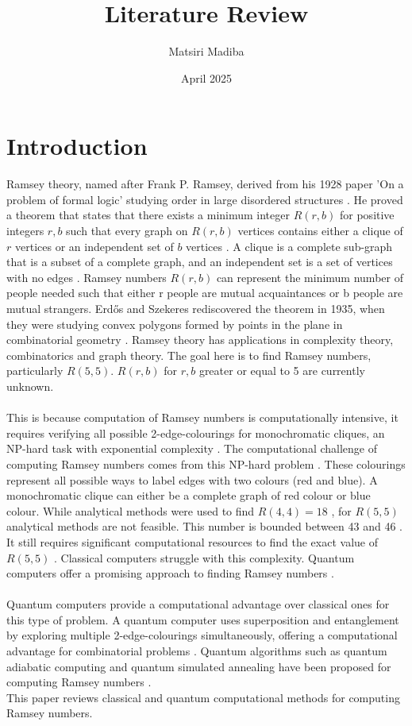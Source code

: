 \documentclass{Assignment}
\author{Matsiri Madiba}
\date{April 2025}
\title{Literature Review}
\begin{document}
\maketitle

\section{Introduction}
Ramsey theory, named after Frank P. Ramsey, derived from his 1928 paper 'On a problem of formal logic' studying order in large disordered structures \cite{graham1980ramsey}.
He proved a theorem that states that there exists a minimum integer $R(r,b)$ for positive integers $r, b$ such that every graph on $R(r,b)$ vertices contains either a clique of $r$ vertices or an independent set of $b$ vertices \cite{BondyMurty2008}.
A clique is a complete sub-graph that is a subset of a complete graph, and an independent set is a set of vertices with no edges \cite{BondyMurty2008}.	
Ramsey numbers $R(r,b)$ can represent the minimum number of people needed such that either r people are mutual acquaintances or b people are mutual strangers.
Erd\H{o}s and Szekeres rediscovered the theorem in 1935, when they were studying convex polygons formed by points in the plane in combinatorial geometry \cite{BondyMurty2008}.
Ramsey theory has applications in complexity theory, combinatorics and graph theory. 
The goal here is to find Ramsey numbers, particularly $R(5,5)$.
$R(r,b)$ for $r,b$ greater or equal to 5 are currently unknown.
\\\\
This is because computation of Ramsey numbers is computationally intensive, it requires verifying all possible 2-edge-colourings for monochromatic cliques, an NP-hard task with exponential complexity \cite{PhysRevA.93.032301, burr1981generalized}.
The computational challenge of computing Ramsey numbers comes from this NP-hard problem \cite{burr1981generalized}.
These colourings represent all possible ways to label edges with two colours (red and blue).
A monochromatic clique can either be a complete graph of red colour or blue colour.
While analytical methods were used to find $R(4,4)=18$ \cite{GreenwoodGleason1955},
for $R(5,5)$ analytical methods are not feasible.
This number is bounded between 43 \cite{Exoo1993} and 46 \cite{angeltveit2024r55le46}.
It still requires significant computational resources to find the exact value of $R(5,5)$ \cite{spencer1994}.
Classical computers struggle with this complexity.
Quantum computers offer a promising approach to finding Ramsey numbers \cite{PhysRevA.93.032301}.
\\\\
Quantum computers provide a computational advantage over classical ones for this type of problem.
A quantum computer uses superposition and entanglement by exploring multiple 2-edge-colourings simultaneously, offering a computational advantage for combinatorial problems  \cite{Deutsch1989,PhysRevA.93.032301}.
Quantum algorithms such as quantum adiabatic computing and quantum simulated annealing have been proposed for computing Ramsey numbers \cite{gaitan2012ramsey, PhysRevA.93.032301}.
\\
This paper reviews classical and quantum computational methods for computing Ramsey numbers.
\end{document}
